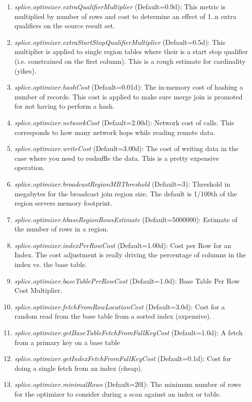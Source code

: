 \begin{enumerate}
	\item \emph{splice.optimizer.extraQualifierMultiplier} (Default=0.9d): This metric is multiplied by number of rows and cost to determine an effect of 1..n extra qualifiers on the source result set.  
	\item \emph{splice.optimizer.extraStartStopQualifierMultiplier} (Default=0.5d): This multiplier is applied to single region tables where their is a start stop qualifier (i.e. constrained on the first column).  This is a rough estimate for cardinality (yikes).
	\item \emph{splice.optimizer.hashCost} (Default=0.01d): The in-memory cost of hashing a number of records.  This cost is applied to make sure merge join is promoted for not having to perform a hash. 
	\item \emph{splice.optimizer.networkCost} (Default=2.00d): Network cost of calls.  This corresponds to how many network hops while reading remote data.
	\item \emph{splice.optimizer.writeCost} (Default=3.00d): The cost of writing
	data in the case where you need to reshuffle the data.  This is a pretty expensive operation.
	\item \emph{splice.optimizer.broadcastRegionMBThreshold} (Default=3): Threshold
	in megabytes for the broadcast join region size.  The default is 1/100th of the
	region servers memory footprint.
	\item \emph{splice.optimizer.hbaseRegionRowsEstimate} (Default=5000000): Estimate of the number of rows in a region.
	\item \emph{splice.optimizer.indexPerRowCost} (Default=1.00d): Cost per Row for an Index.  The cost adjustment is really driving the percentage of columns in the index vs. the base table.
	\item \emph{splice.optimizer.baseTablePerRowCost} (Default=1.0d): Base Table
	Per Row Cost Multiplier.
	\item \emph{splice.optimizer.fetchFromRowLocationCost} (Default=3.0d): Cost for a random read from the base table from a sorted index (expensive).
	\item \emph{splice.optimizer.getBaseTableFetchFromFullKeyCost} (Default=1.0d):
	A fetch from a primary key on a base table
	\item \emph{splice.optimizer.getIndexFetchFromFullKeyCost} (Default=0.1d): Cost
	for doing a single fetch from an index (cheap).
	\item \emph{splice.optimizer.minimalRows} (Default=20l): The minimum number of rows for the optimizer to consider during a scan against an index or table.	
\end{enumerate}

